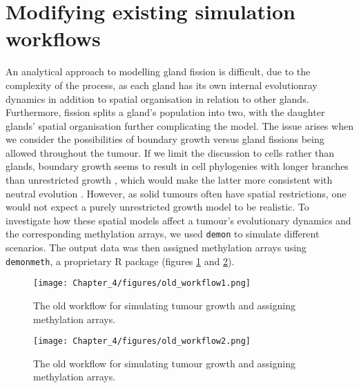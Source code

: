 \section{Modifying existing simulation workflows}\label{section:old_famework}
An analytical approach to modelling gland fission is difficult, due to the complexity of the process,
as each gland has its own internal evolutionray dynamics in addition to spatial organisation in relation
to other glands. Furthermore, fission splits a gland's population into two, with the daughter glands'
spatial organisation further complicating the model. The issue arises when we consider the possibilities
of boundary growth versus gland fissions being allowed throughout the tumour. If we limit the discussion
to cells rather than glands, boundary growth seems to result in cell phylogenies with longer branches than
unrestricted growth \cite{lewinsohn_state-dependent_2023}, which would make the latter more consistent with
neutral evolution \cite{sottoriva_big_2015, williams_identification_2016}. However, as solid tumours often have spatial restrictions,
one would not expect a purely unrestricted growth model to be realistic. To investigate how these spatial
models affect a tumour's evolutionary dynamics and the corresponding methylation arrays, we used \texttt{demon}
to simulate different scenarios. The output data was then assigned methylation arrays using \texttt{demonmeth},
a proprietary R package (figures \ref{fig:old_workflow1} and \ref{fig:old_workflow2}).

\begin{figure}[h]
    \centering
    \texttt{[image: Chapter\_4/figures/old\_workflow1.png]}
    \caption{The old workflow for simulating tumour growth and assigning methylation arrays.}
    \label{fig:old_workflow1}
\end{figure}
\begin{figure}[h]
    \centering
    \texttt{[image: Chapter\_4/figures/old\_workflow2.png]}
    \caption{The old workflow for simulating tumour growth and assigning methylation arrays.}
    \label{fig:old_workflow2}
\end{figure}

